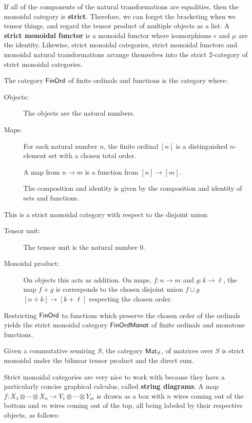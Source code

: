 If all of the components of the natural transformations are equalities, then the monoidal category is {\bf strict}.  Therefore, we can forget the bracketing when we tensor things, and regard the tensor product of multiple objects as a list.
A {\bf strict monoidal functor} is a monoidal functor where isomorphisms $\epsilon$ and $\mu$ are the identity.
Likewise, strict monoidal categories, strict monoidal functors and monoidal natural transformations arrange themselves into the strict 2-category of strict monoidal categories.
\begin{example}
The category $\mathsf{FinOrd}$ of finite ordinals and functions is the category where:
\begin{description}
\item[Objects:] The objects are the natural numbers.
\item[Maps:]
For each natural number $n$, the finite ordinal $[n]$ is a distinguished $n$-element set with a chosen total order.

A map from $n\to m$ is a function from $[n]\to [m]$.

The composition and identity is given by the composition and identity of sets and functions.
\end{description}
This is a strict monoidal category with respect to the disjoint union:
\begin{description}
\item[Tensor unit:] The tensor unit is the natural number 0.
\item[Monoidal product:]
On objects this acts as addition.  On maps, $f:n\to m$ and $g:k\to \ell$, the map $f+g$ is corresponds to the chosen disjoint union $f\sqcup g$ $[n+k]\to [k+\ell]$ respecting the chosen order.
\end{description}
%
%
Restricting $\mathsf{FinOrd}$ to functions which preserve the chosen order of the ordinals yields the strict monoidal category $\mathsf{FinOrdMonot}$ of finite ordinals and monotone functions.
\end{example}
\begin{example}
Given a commutative semiring $S$, the category $\mathsf{Mat}_S$, of matrices over $S$ is strict monoidal under the bilinear tensor product and the direct sum.
\end{example}
Strict monoidal categories are very nice to work with because they have a particularly concise graphical calculus, called {\bf string diagrams}.  A map $f:X_1\otimes \cdots \otimes X_n\to Y_1\otimes \cdots \otimes Y_m$ is drawn as a box with $n$ wires coming out of the bottom and $m$ wires coming out of the top, all being labeled by their respective objects, as follows:

